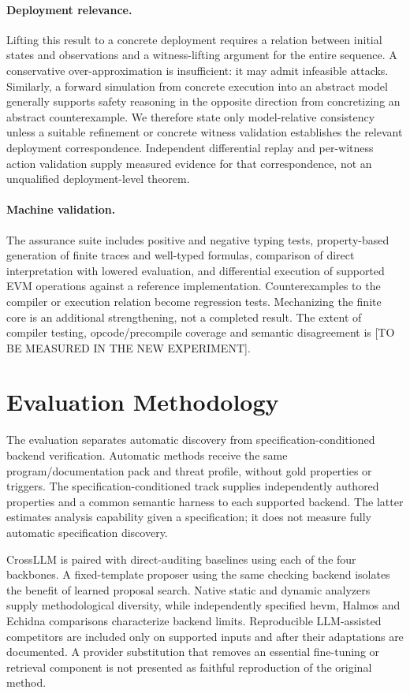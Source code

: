 \documentclass[journal]{IEEEtran}
\theoremstyle{definition}
\newcommand{\CrossTBD}{\textnormal{[TO BE MEASURED IN THE NEW EXPERIMENT]}}
\begin{document}
\paragraph{Deployment relevance.}
Lifting this result to a concrete deployment requires a relation between initial states and observations and a witness-lifting argument for the entire sequence. A conservative over-approximation is insufficient: it may admit infeasible attacks. Similarly, a forward simulation from concrete execution into an abstract model generally supports safety reasoning in the opposite direction from concretizing an abstract counterexample. We therefore state only model-relative consistency unless a suitable refinement or concrete witness validation establishes the relevant deployment correspondence. Independent differential replay and per-witness action validation supply measured evidence for that correspondence, not an unqualified deployment-level theorem.

\paragraph{Machine validation.}
The assurance suite includes positive and negative typing tests, property-based generation of finite traces and well-typed formulas, comparison of direct interpretation with lowered evaluation, and differential execution of supported EVM operations against a reference implementation. Counterexamples to the compiler or execution relation become regression tests. Mechanizing the finite core is an additional strengthening, not a completed result. The extent of compiler testing, opcode/precompile coverage and semantic disagreement is \CrossTBD.

\section{Evaluation Methodology}
\label{sec:evaluation-v2}

The evaluation separates automatic discovery from specification-conditioned backend verification. Automatic methods receive the same program/documentation pack and threat profile, without gold properties or triggers. The specification-conditioned track supplies independently authored properties and a common semantic harness to each supported backend. The latter estimates analysis capability given a specification; it does not measure fully automatic specification discovery.

CrossLLM is paired with direct-auditing baselines using each of the four backbones. A fixed-template proposer using the same checking backend isolates the benefit of learned proposal search. Native static and dynamic analyzers supply methodological diversity, while independently specified hevm, Halmos and Echidna comparisons characterize backend limits. Reproducible LLM-assisted competitors are included only on supported inputs and after their adaptations are documented. A provider substitution that removes an essential fine-tuning or retrieval component is not presented as faithful reproduction of the original method.
\end{document}
